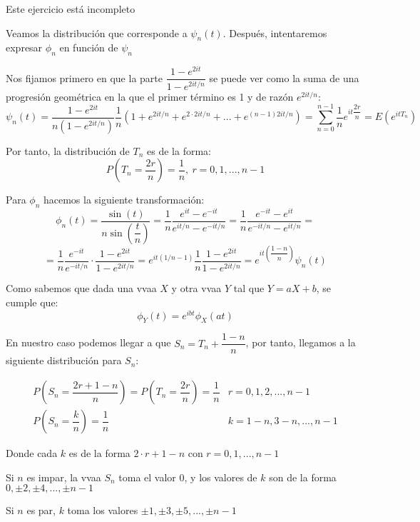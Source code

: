 \documentclass[openany]{book}
\begin{document}
\begin{exercise}
Este ejercicio está incompleto



Veamos la distribución que corresponde a $ \psi_n(t) $. Después, intentaremos expresar $ \phi_n $ en función de $ \psi_n $

Nos fijamos primero en que la parte $ \dfrac{1-e^{2it}}{1-e^{2it/n}} $ se puede ver como la suma de una progresión geométrica en la que el primer término es 1 y de razón $ e^{2it/n} $:
$$ \psi_n(t) = \dfrac{1-e^{2it}}{n(1-e^{2it/n})} \dfrac{1}{n} (1+e^{2it/n} + e^{2\cdot 2it/n} + ... + e^{(n-1)2it/n}) = \sum\limits_{n=0}^{n-1}\dfrac{1}{n} e^{it \dfrac{2r}{n}} = E(e^{itT_n}) $$

Por tanto, la distribución de $ T_n $ es de la forma:
$$ P(T_n = \dfrac{2r}{n}) = \dfrac{1}{n},\ r = 0,1,...,n-1 $$

Para $ \phi_n $ hacemos la siguiente transformación:
$$ \phi_n(t) = \dfrac{\sin(t)}{n \sin(\dfrac{t}{n})} = \dfrac{1}{n} \dfrac{e^{it}-e^{-it}}{e^{it/n}-e^{-it/n}} = \dfrac{1}{n} \dfrac{e^{-it}-e^{it}}{e^{-it/n}-e^{it/n}} = $$
$$ = \dfrac{1}{n} \dfrac{e^{-it}}{e^{-it/n}} \cdot  \dfrac{1-e^{2it}}{1-e^{2it/n}} = e^{it(1/n-1)} \dfrac{1}{n} \dfrac{1-e^{2it}}{1-e^{2it/n}} = e^{it(\dfrac{1-n}{n})} \psi_n(t) $$

Como sabemos que dada una vvaa $ X $ y otra vvaa $ Y $ tal que $ Y = aX+b $, se cumple que:
$$ \phi_{Y}(t) = e^{ibt}\phi_{X}(at) $$

En nuestro caso podemos llegar a que $ S_n = T_n+ \dfrac{1-n}{n} $, por tanto, llegamos a la siguiente distribución para $ S_n $:

$$ 
\begin{matrix}
    P(S_n = \dfrac{2r+1-n}{n}) = P(T_n = \dfrac{2r}{n}) = \dfrac{1}{n} &  r = 0,1,2,...,n-1 \\
    P(S_n = \dfrac{k}{n}) = \dfrac{1}{n} & k = 1-n,3-n,...,n-1
\end{matrix}
$$

Donde cada $ k  $ es de la forma $ 2\cdot r+1-n $ con $ r = 0,1,...,n-1 $


Si $ n $ es impar, la vvaa $ S_n $ toma el valor 0, y los valores de $ k  $ son de la forma $ 0,\pm 2,\pm  4,...,\pm n-1 $

Si $ n  $ es par, $ k $ toma los valores $ \pm 1,\pm 3,\pm 5,...,\pm n-1 $

    
\end{exercise}
\end{document}
